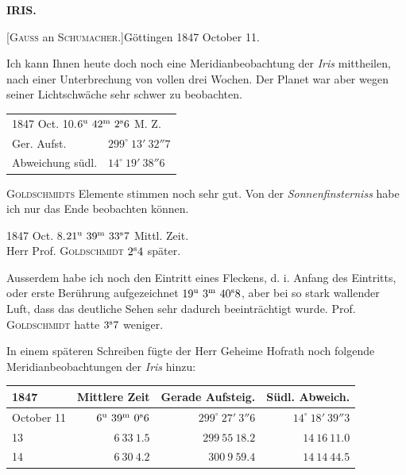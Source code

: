 \clearpage
\noindent{}%
\makebox[12mm][l]{}%
\parbox[t]{\dimexpr\linewidth-24mm\relax}{\centering\footnotesize\bfseries IRIS.\par}%
\par\nobreak\medskip
{}
\begin{center}[\textsc{Gauss} an \textsc{Schumacher}.]\quad Göttingen 1847 October 11.\end{center}

Ich kann Ihnen heute doch noch eine Meridianbeobachtung der \emph{Iris} mittheilen, nach einer Unterbrechung von vollen drei Wochen. Der Planet war aber wegen seiner Lichtschwäche sehr schwer zu beobachten.

\begin{center}
\begin{tabular}{ll}
\multicolumn{2}{l}{1847 Oct. 10.\quad $6^{\rm u}\ 42^{\rm m}\ 2^{\rm s}6$ M. Z.} \\
Ger. Aufst. & $299^\circ\ 13'\ 32''7$ \\
Abweichung südl. & $14^\circ\ 19'\ 38''6$ \\
\end{tabular}
\end{center}

\textsc{Goldschmidts} Elemente stimmen noch sehr gut. Von der \emph{Sonnenfinsterniss} habe ich nur das Ende beobachten können.

\begin{center}
1847 Oct. 8.\quad $21^{\rm u}\ 39^{\rm m}\ 33^{\rm s}7$ Mittl. Zeit.\\
Herr Prof. \textsc{Goldschmidt} $2^{\rm s}4$ später.
\end{center}

Ausserdem habe ich noch den Eintritt eines Fleckens, d. i. Anfang des Eintritts, oder erste Berührung aufgezeichnet $19^{\rm u}\ 3^{\rm m}\ 40^{\rm s}8$, aber bei so stark wallender Luft, dass das deutliche Sehen sehr dadurch beeinträchtigt wurde. Prof. \textsc{Goldschmidt} hatte $3^{\rm s}7$ weniger.

In einem späteren Schreiben fügte der Herr Geheime Hofrath noch folgende Meridianbeobachtungen der \emph{Iris} hinzu:

\begin{center}
\setlength{\tabcolsep}{4pt}
\begin{tabular}{l|r|r|r}
1847 & Mittlere Zeit & Gerade Aufsteig. & Südl. Abweich. \\\hline
October 11 & $6^{\rm u}\ 39^{\rm m}\ 0^{\rm s}6$ & $299^\circ\ 27'\ 3''6$ & $14^\circ\ 18'\ 39''3$ \\
\hfill 13 & $6\ 33\ 1.5$ & $299\ 55\ 18.2$ & $14\ 16\ 11.0$ \\
\hfill 14 & $6\ 30\ 4.2$ & $300\ 9\ 59.4$ & $14\ 14\ 44.5$ \\
\end{tabular}
\end{center}

